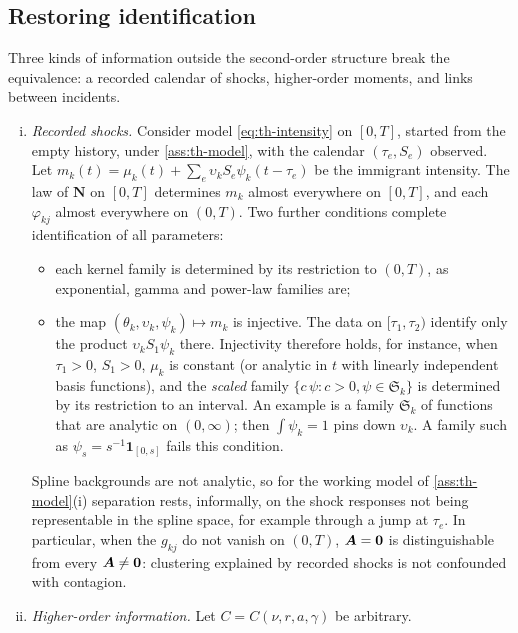 \subsection{Restoring identification}\label{sec:th-restore}

Three kinds of information outside the second-order structure break the equivalence: a
recorded calendar of shocks, higher-order moments, and links between incidents.

\begin{corollary}\label{cor:equiv-id}
\begin{enumerate}[(i)]
  \item \emph{Recorded shocks.} Consider model \eqref{eq:th-intensity} on $[0,T]$,
  started from the empty history, under \cref{ass:th-model}, with the calendar
  $(\tau_e,S_e)$ observed. Let
  $m_k(t)=\mu_k(t)+\sum_e\upsilon_kS_e\psi_k(t-\tau_e)$ be the immigrant intensity. The
  law of $\bm N$ on $[0,T]$ determines $m_k$ almost everywhere on $[0,T]$, and each
  $\varphi_{kj}$ almost everywhere on $(0,T)$. Two further conditions complete
  identification of all parameters:
  \begin{itemize}
    \item each kernel family is determined by its restriction to $(0,T)$, as
      exponential, gamma and power-law families are;
    \item the map $(\theta_k,\upsilon_k,\psi_k)\mapsto m_k$ is injective. The data on
      $[\tau_1,\tau_2)$ identify only the product $\upsilon_kS_1\psi_k$ there. Injectivity
      therefore holds, for instance, when $\tau_1>0$, $S_1>0$, $\mu_k$ is constant
      (or analytic in $t$ with linearly independent basis functions), and the
      \emph{scaled} family $\{c\,\psi:c>0,\psi\in\mathfrak S_k\}$ is determined by its
      restriction to an interval. An example is a family $\mathfrak S_k$ of functions that
      are analytic on $(0,\infty)$; then $\int\psi_k=1$ pins down $\upsilon_k$. A
      family such as $\psi_s=s^{-1}\mathbf 1_{[0,s]}$ fails this condition.
  \end{itemize}
  Spline backgrounds are not analytic, so for the working model of
  \cref{ass:th-model}(i) separation rests, informally, on the shock responses not being
  representable in the spline space, for example through a jump at $\tau_e$.
  In particular, when the $g_{kj}$ do not vanish on $(0,T)$, $\bm{A}=\mathbf{0}$ is
  distinguishable from every $\bm{A}\ne\mathbf{0}$: clustering explained by recorded shocks
  is not confounded with contagion.
  \item \emph{Higher-order information.} Let $C=C(\nu,r,a,\gamma)$ be arbitrary.

\end{enumerate}
\end{corollary}
